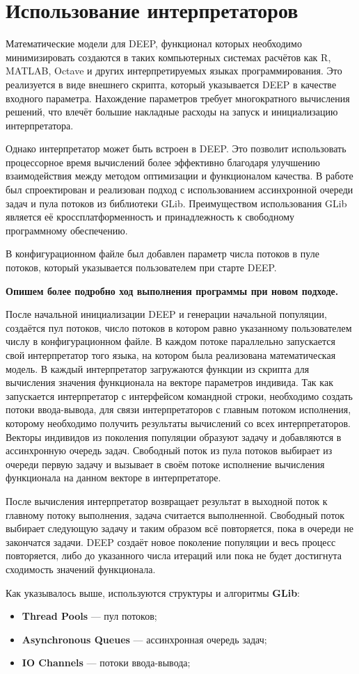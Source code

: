 \section*{Использование интерпретаторов}

Математические модели для DEEP,
функционал которых необходимо минимизировать
создаются в таких компьютерных системах расчётов
как R, MATLAB, Octave
и других интерпретируемых языках программирования.
Это реализуется в виде внешнего скрипта,
который указывается DEEP в качестве входного параметра.
Нахождение параметров требует
многократного вычисления решений,
что влечёт большие накладные расходы
на запуск и инициализацию интерпретатора.

Однако интерпретатор может быть встроен в DEEP.
Это позволит использовать процессорное время вычислений
более эффективно благодаря
улучшению взаимодействия между
методом оптимизации и
функционалом качества.
В работе был спроектирован и реализован
подход с использованием
ассинхронной очереди задач и пула потоков
из библиотеки GLib.
Преимуществом использования GLib
является её кроссплатформенность
и принадлежность к свободному программному обеспечению.

В конфигурационном файле был добавлен
параметр числа потоков в пуле потоков,
который указывается пользователем
при старте DEEP.

\textbf{Опишем более подробно ход выполнения программы
при новом подходе.}

После начальной инициализации DEEP
и генерации начальной популяции,
создаётся пул потоков,
число потоков в котором равно
указанному пользователем числу в
конфигурационном файле.
В каждом потоке параллельно
запускается свой интерпретатор того языка,
на котором была реализована математическая модель.
В каждый интерпретатор загружаются
функции из скрипта
для вычисления значения функционала
на векторе параметров индивида.
Так как запускается интерпретатор
с интерфейсом командной строки,
необходимо создать потоки ввода-вывода,
для связи интерпретаторов
с главным потоком исполнения,
которому необходимо получить
результаты вычислений со всех интерпретаторов.
Векторы индивидов из поколения популяции
образуют задачу и
добавляются в ассинхронную очередь задач.
Свободный поток из пула потоков
выбирает из очереди первую задачу
и вызывает в своём потоке
исполнение вычисления функционала
на данном векторе в интерпретаторе.

После вычисления интерпретатор
возвращает результат в
выходной поток к главному потоку выполнения,
задача считается выполненной.
Свободный поток выбирает следующую задачу
и таким образом всё повторяется,
пока в очереди не закончатся задачи.
DEEP создаёт новое поколение популяции
и весь процесс повторяется,
либо до указанного числа итераций или
пока не будет достигнута сходимость
значений функционала.

Как указывалось выше,
используются структуры и алгоритмы
\textbf{GLib}\cite{GLib}:

\begin{itemize}
    \item \textbf{Thread Pools} --- пул потоков;
    \item \textbf{Asynchronous Queues} --- ассинхронная очередь задач;
    \item \textbf{IO Channels} --- потоки ввода-вывода;
\end{itemize}

